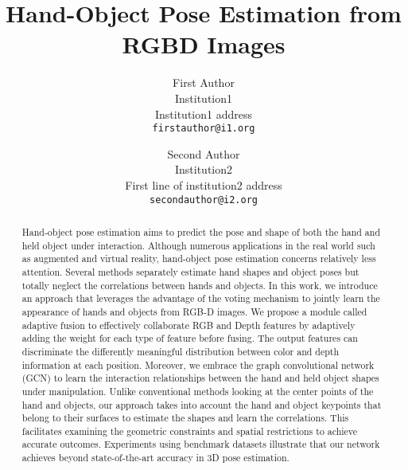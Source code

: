 \documentclass[review]{cvpr}
\begin{document}
\title{Hand-Object Pose Estimation from RGBD Images}

\author{First Author\\
Institution1\\
Institution1 address\\
{\tt\small firstauthor@i1.org}
\and
Second Author\\
Institution2\\
First line of institution2 address\\
{\tt\small secondauthor@i2.org}
}

\maketitle


\begin{abstract}
Hand-object pose estimation aims to predict the pose and shape of both the hand and held object under interaction. Although numerous applications in the real world such as augmented and virtual reality, hand-object pose estimation concerns relatively less attention. Several methods separately estimate hand shapes and object poses but totally neglect the correlations between hands and objects. In this work, we introduce an approach that leverages the advantage of the voting mechanism to jointly learn the appearance of hands and objects from RGB-D images. We propose a module called adaptive fusion to effectively collaborate RGB and Depth features by adaptively adding the weight for each type of feature before fusing. The output features can discriminate the differently meaningful distribution between color and depth information at each position. Moreover, we embrace the graph convolutional network (GCN) to learn the interaction relationships between the hand and held object shapes under manipulation. Unlike conventional methods looking at the center points of the hand and objects, our approach takes into account the hand and object keypoints that belong to their surfaces to estimate the shapes and learn the correlations. This facilitates examining the geometric constraints and spatial restrictions to achieve accurate outcomes. Experiments using benchmark datasets illustrate that our network achieves beyond state-of-the-art accuracy in 3D pose estimation.
\end{abstract}


%

%

%

%

%
{\small


}
\end{document}
